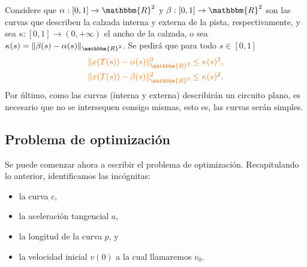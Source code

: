 \documentclass[10pt,mathserif]{beamer}
\newcommand{\R}{\mathbbm{R}}
\newcommand{\arr}{\rightarrow}
\begin{document}
\begin{frame}

Considere que $\alpha:[0,1]\arr\R^2$ y $\beta:[0,1]\arr\R^2$ son las curvas que describen la calzada interna y externa de la pista, respectivamente, y sea $\kappa:[0,1]\arr(0,+\infty)$ el ancho de la calzada, o sea $\kappa(s)=\|\beta(s)-\alpha(s)\|_{\R^2}$. Se pedirá que para todo $s\in[0,1]$
\begin{equation*}
\textcolor{myorange}{\begin{array}{c}
 \|x(T(s))-\alpha(s)\|_{\R^2}^2 \leq \kappa(s)^2,\\[2mm]
 \|x(T(s))-\beta(s)\|_{\R^2}^2 \leq \kappa(s)^2.
\end{array}}
\end{equation*}
\pause
Por último, como las curvas (interna y externa) describirán un circuito plano, es necesario que no se intersequen consigo mismas, esto es, las curvas serán simples.
\vspace{5cm}
\end{frame}
\subsection{Problema de optimización}
\begin{frame}


Se puede comenzar ahora a escribir el problema de optimización.
Recapitulando lo anterior, identificamos las incógnitas:
\begin{itemize}
 \item la curva $c$,
 \item la aceleración tangencial $a$,
 \item la longitud de la curva $p$, y
 \item la velocidad inicial $v(0)$ a la cual llamaremos $v_0$.
\end{itemize}

\end{frame}
\end{document}
